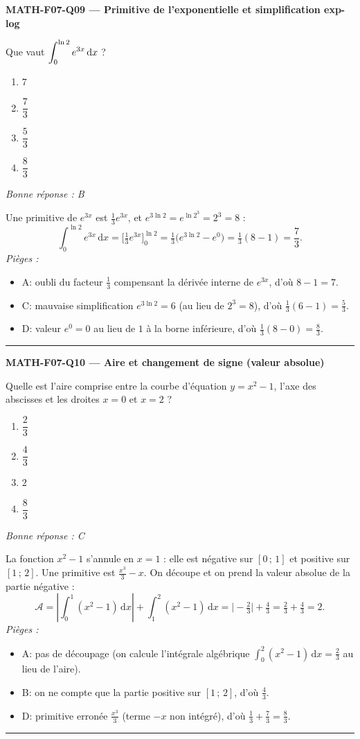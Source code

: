 \documentclass[11pt,a4paper]{article}
\begin{document}
\noindent\textbf{MATH-F07-Q09 --- Primitive de l'exponentielle et simplification exp-log}\par
Que vaut $\displaystyle\int_{0}^{\ln 2} e^{3x}\,\mathrm{d}x$ ?
\begin{enumerate}[label=\Alph*)]
\item $7$
\item $\dfrac{7}{3}$
\item $\dfrac{5}{3}$
\item $\dfrac{8}{3}$
\end{enumerate}
\textit{Bonne réponse : B}\par
Une primitive de $e^{3x}$ est $\tfrac13 e^{3x}$, et $e^{3\ln 2}=e^{\ln 2^{3}}=2^{3}=8$ :
\[
\int_{0}^{\ln 2} e^{3x}\,\mathrm{d}x=\Big[\tfrac13 e^{3x}\Big]_{0}^{\ln 2}
=\tfrac13\big(e^{3\ln 2}-e^{0}\big)=\tfrac13(8-1)=\dfrac{7}{3}.
\]
\textit{Pièges :}
\begin{itemize}
\item A: oubli du facteur $\tfrac13$ compensant la dérivée interne de $e^{3x}$, d'où $8-1=7$.
\item C: mauvaise simplification $e^{3\ln 2}=6$ (au lieu de $2^{3}=8$), d'où $\tfrac13(6-1)=\tfrac53$.
\item D: valeur $e^{0}=0$ au lieu de $1$ à la borne inférieure, d'où $\tfrac13(8-0)=\tfrac83$.
\end{itemize}
\vspace{8pt}\hrule\vspace{8pt}

\noindent\textbf{MATH-F07-Q10 --- Aire et changement de signe (valeur absolue)}\par
Quelle est l'aire comprise entre la courbe d'équation $y=x^{2}-1$, l'axe des abscisses et les droites $x=0$ et $x=2$ ?
\begin{enumerate}[label=\Alph*)]
\item $\dfrac{2}{3}$
\item $\dfrac{4}{3}$
\item $2$
\item $\dfrac{8}{3}$
\end{enumerate}
\textit{Bonne réponse : C}\par
La fonction $x^{2}-1$ s'annule en $x=1$ : elle est négative sur $[0\,;\,1]$ et positive sur $[1\,;\,2]$. Une primitive est $\tfrac{x^{3}}{3}-x$. On découpe et on prend la valeur absolue de la partie négative :
\[
\mathcal{A}=\left|\int_{0}^{1}(x^{2}-1)\,\mathrm{d}x\right|+\int_{1}^{2}(x^{2}-1)\,\mathrm{d}x
=\Big|-\tfrac23\Big|+\tfrac43=\tfrac23+\tfrac43=2.
\]
\textit{Pièges :}
\begin{itemize}
\item A: pas de découpage (on calcule l'intégrale algébrique $\int_{0}^{2}(x^{2}-1)\,\mathrm{d}x=\tfrac23$ au lieu de l'aire).
\item B: on ne compte que la partie positive sur $[1\,;\,2]$, d'où $\tfrac43$.
\item D: primitive erronée $\tfrac{x^{3}}{3}$ (terme $-x$ non intégré), d'où $\tfrac13+\tfrac73=\tfrac83$.
\end{itemize}
\vspace{8pt}\hrule\vspace{8pt}
\end{document}

